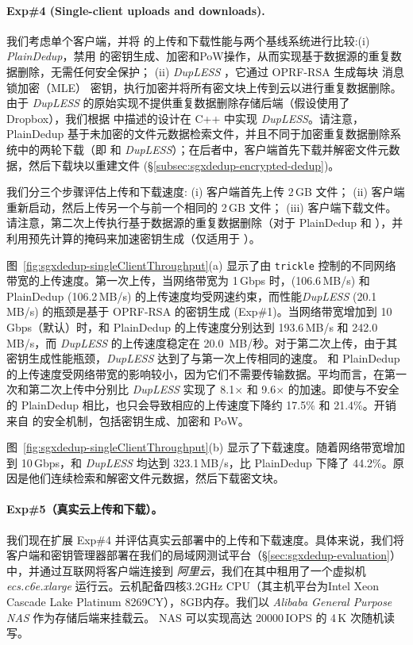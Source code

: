 \paragraph*{Exp\#4 (Single-client uploads and downloads).} 我们考虑单个客户端，并将 \sysnameS 的上传和下载性能与两个基线系统进行比较:(i) \textit{ PlainDedup}，禁用 \sysnameS 的密钥生成、加密和PoW操作，从而实现基于数据源的重复数据删除，无需任何安全保护； (ii) \textit{ {\em DupLESS}} \cite{bellare13b}，它通过 OPRF-RSA 生成每块 消息锁加密（MLE） 密钥，执行加密并将所有密文块上传到云以进行重复数据删除。由于 {\em DupLESS} 的原始实现不提供重复数据删除存储后端（假设使用了 Dropbox），我们根据 \cite{bellare13b} 中描述的设计在 C++ 中实现 {\em DupLESS}。请注意，PlainDedup 基于未加密的文件元数据检索文件，并且不同于加密重复数据删除系统中的两轮下载（即 \sysnameS 和 {\em DupLESS}）；在后者中，客户端首先下载并解密文件元数据，然后下载块以重建文件 (\S\ref{subsec:sgxdedup-encrypted-dedup})。

我们分三个步骤评估上传和下载速度: (i) 客户端首先上传 2\,GB 文件； (ii) 客户端重新启动，然后上传另一个与前一个相同的 2\,GB 文件； (iii) 客户端下载文件。请注意，第二次上传执行基于数据源的重复数据删除（对于 PlainDedup 和 \sysnameS），并利用预先计算的掩码来加速密钥生成（仅适用于 \sysnameS）。

图~\ref{fig:sgxdedup-singleClientThroughput}(a) 显示了由 {\tt trickle} \cite{eriksen05} 控制的不同网络带宽的上传速度。第一次上传，当网络带宽为 1\,Gbps 时，\sysnameS (106.6\,MB/s) 和 PlainDedup (106.2\,MB/s) 的上传速度均受网速约束，而性能{\em DupLESS} (20.1\,MB/s) 的瓶颈是基于 OPRF-RSA 的密钥生成 (Exp\#1)。当网络带宽增加到 10\,Gbps（默认）时，\sysnameS 和 PlainDedup 的上传速度分别达到 193.6\,MB/s 和 242.0\,MB/s，而 {\em DupLESS} 的上传速度稳定在 20.0\, MB/秒。对于第二次上传，由于其密钥生成性能瓶颈，{\em DupLESS} 达到了与第一次上传相同的速度。 \sysnameS 和 PlainDedup 的上传速度受网络带宽的影响较小，因为它们不需要传输数据。平均而言，\sysnameS 在第一次和第二次上传中分别比 {\em DupLESS} 实现了 8.1$\times$ 和 9.6$\times$ 的加速。即使与不安全的 PlainDedup 相比，\sysnameS 也只会导致相应的上传速度下降约 17.5\% 和 21.4\%。开销来自 \sysnameS 的安全机制，包括密钥生成、加密和 PoW。

图~\ref{fig:sgxdedup-singleClientThroughput}(b) 显示了下载速度。随着网络带宽增加到 10\,Gbps，\sysnameS 和 {\em DupLESS} 均达到 323.1\,MB/s，比 PlainDedup 下降了 44.2\%。原因是他们连续检索和解密文件元数据，然后下载密文块。

\paragraph*{Exp\#5（真实云上传和下载）。} 我们现在扩展 Exp\#4 并评估真实云部署中的上传和下载速度。具体来说，我们将客户端和密钥管理器部署在我们的局域网测试平台（\S\ref{sec:sgxdedup-evaluation}）中，并通过互联网将客户端连接到\textit{ 阿里云}，我们在其中租用了一个虚拟机\textit{ ecs.c6e.xlarge} 运行云。云机配备四核3.2GHz CPU（其主机平台为Intel Xeon Cascade Lake Platinum 8269CY），8GB内存。我们以 \textit{ Alibaba General Purpose NAS} 作为存储后端来挂载云。 NAS 可以实现高达 20000\,IOPS 的 4\,K 次随机读写。

